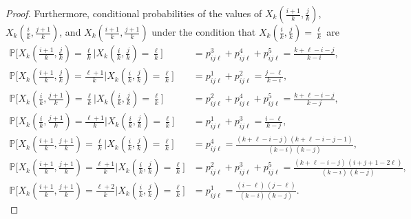 \documentclass[12pt,a4paper]{amsart}
\theoremstyle{definition}
\newcommand{\PP}{\mathbb{P}}
\begin{document}
\begin{proof}
Furthermore, conditional probabilities of the values of $X_k(\tfrac{i+1}{k},\tfrac{j}{k})$, $X_k(\tfrac{i}{k},\tfrac{j+1}{k})$, and $X_k(\tfrac{i+1}{k},\tfrac{j+1}{k})$ under the condition that $X_k(\tfrac{i}{k},\tfrac{j}{k})  = \tfrac{\ell}{k}$ are
\begin{align*}
   \PP\big[X_k(\tfrac{i+1}{k},\tfrac{j}{k}) = \tfrac{\ell}{k} \big| X_k(\tfrac{i}{k},\tfrac{j}{k}) = \tfrac{\ell}{k}\big] 
   &= p_{ij\ell}^3 + p_{ij\ell}^4 + p_{ij\ell}^5 = \frac{k+\ell-i-j}{k-i}, \\
   \PP\big[X_k(\tfrac{i+1}{k},\tfrac{j}{k}) = \tfrac{\ell+1}{k} \big| X_k(\tfrac{i}{k},\tfrac{j}{k}) = \tfrac{\ell}{k}\big] 
   &= p_{ij\ell}^1 + p_{ij\ell}^2 = \frac{j-\ell}{k-i}, \\
   \PP\big[X_k(\tfrac{i}{k},\tfrac{j+1}{k}) = \tfrac{\ell}{k} \big| X_k(\tfrac{i}{k},\tfrac{j}{k}) = \tfrac{\ell}{k}\big] 
   &= p_{ij\ell}^2 + p_{ij\ell}^4 + p_{ij\ell}^5 = \frac{k+\ell-i-j}{k-j}, \\
   \PP\big[X_k(\tfrac{i}{k},\tfrac{j+1}{k}) = \tfrac{\ell+1}{k} \big| X_k(\tfrac{i}{k},\tfrac{j}{k}) = \tfrac{\ell}{k}\big] 
   &= p_{ij\ell}^1 + p_{ij\ell}^3 = \frac{i-\ell}{k-j}, \\
   \PP\big[X_k(\tfrac{i+1}{k},\tfrac{j+1}{k}) = \tfrac{\ell}{k} \big| X_k(\tfrac{i}{k},\tfrac{j}{k}) = \tfrac{\ell}{k}\big] 
   &= p_{ij\ell}^4 = \frac{(k+\ell-i-j) \, (k+\ell-i-j-1)}{(k-i) \, (k-j)}, \\
   \PP\big[X_k(\tfrac{i+1}{k},\tfrac{j+1}{k}) = \tfrac{\ell+1}{k} \big| X_k(\tfrac{i}{k},\tfrac{j}{k}) = \tfrac{\ell}{k}\big] 
   &= p_{ij\ell}^2 + p_{ij\ell}^3 + p_{ij\ell}^5 = \frac{(k+\ell-i-j) \, (i+j+1-2\ell)}{(k-i) \, (k-j)}, \\
   \PP\big[X_k(\tfrac{i+1}{k},\tfrac{j+1}{k}) = \tfrac{\ell+2}{k} \big| X_k(\tfrac{i}{k},\tfrac{j}{k}) = \tfrac{\ell}{k}\big] 
   &= p_{ij\ell}^1 = \frac{(i-\ell) \, (j-\ell)}{(k-i) \, (k-j)}.
\end{align*}


\end{proof}
\end{document}
